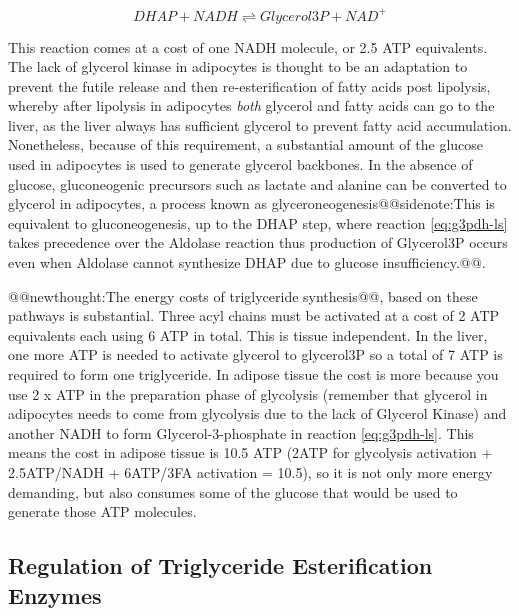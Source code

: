 \documentclass{tufte-handout}
\makeatletter
\def\newthought#1{@@newthought:#1@@}
\def\sidenote#1{@@sidenote:#1@@}
\makeatother
\begin{document}
\begin{equation}\label{eq:g3pdh-ls}
DHAP + NADH \rightleftharpoons Glycerol3P + NAD^+
\end{equation}


This reaction comes at a cost of one NADH molecule, or 2.5 ATP equivalents. The lack of glycerol kinase in adipocytes is thought to be an adaptation to prevent the futile release and then re-esterification of fatty acids post lipolysis, whereby after lipolysis in adipocytes \emph{both} glycerol and fatty acids can go to the liver, as the liver always has sufficient glycerol to prevent fatty acid accumulation. Nonetheless, because of this requirement, a substantial amount of the glucose used in adipocytes is used to generate glycerol backbones. In the absence of glucose, gluconeogenic precursors such as lactate and alanine can be converted to glycerol in adipocytes, a process known as glyceroneogenesis\sidenote{This is equivalent to gluconeogenesis, up to the DHAP step, where reaction \ref{eq:g3pdh-ls} takes precedence over the Aldolase reaction thus production of Glycerol3P occurs even when Aldolase cannot synthesize DHAP due to glucose insufficiency.}.

\newthought{The energy costs of triglyceride synthesis}, based on these pathways is substantial.  Three acyl chains must be activated at a cost of 2 ATP equivalents each using 6 ATP in total. This is tissue independent. In the liver, one more ATP is needed to activate glycerol to glycerol3P so a total of 7 ATP is required to form one triglyceride.  In adipose tissue the cost is more because you use 2 x ATP in the preparation phase of glycolysis (remember that glycerol in adipocytes needs to come from glycolysis due to the lack of Glycerol Kinase) and another NADH to form Glycerol-3-phosphate in reaction \ref{eq:g3pdh-ls}.  This means the cost in adipose tissue is 10.5 ATP (2ATP for glycolysis activation + 2.5ATP/NADH + 6ATP/3FA activation = 10.5), so it is not only more energy demanding, but also consumes some of the glucose that would be used to generate those ATP molecules.

\subsection{Regulation of Triglyceride Esterification Enzymes}  
\end{document}
